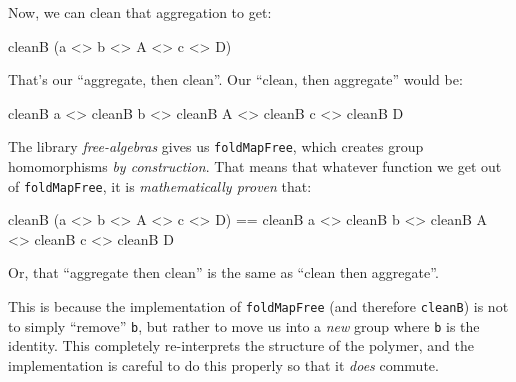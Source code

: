 \documentclass[]{article}
\newenvironment{Shaded}{}{}
\newcommand{\DataTypeTok}[1]{\textcolor[rgb]{0.56,0.13,0.00}{#1}}
\newcommand{\NormalTok}[1]{#1}
\newcommand{\OperatorTok}[1]{\textcolor[rgb]{0.40,0.40,0.40}{#1}}
\begin{document}
Now, we can clean that aggregation to get:

\begin{Shaded}
\begin{Highlighting}[]
\NormalTok{cleanB (a }\OperatorTok{\textless{}\textgreater{}}\NormalTok{ b }\OperatorTok{\textless{}\textgreater{}} \DataTypeTok{A} \OperatorTok{\textless{}\textgreater{}}\NormalTok{ c }\OperatorTok{\textless{}\textgreater{}} \DataTypeTok{D}\NormalTok{)}
\end{Highlighting}
\end{Shaded}

That's our ``aggregate, then clean''. Our ``clean, then aggregate'' would be:

\begin{Shaded}
\begin{Highlighting}[]
\NormalTok{cleanB a }\OperatorTok{\textless{}\textgreater{}}\NormalTok{ cleanB b }\OperatorTok{\textless{}\textgreater{}}\NormalTok{ cleanB }\DataTypeTok{A} \OperatorTok{\textless{}\textgreater{}}\NormalTok{ cleanB c }\OperatorTok{\textless{}\textgreater{}}\NormalTok{ cleanB }\DataTypeTok{D}
\end{Highlighting}
\end{Shaded}

The library \emph{free-algebras} gives us \texttt{foldMapFree}, which creates
group homomorphisms \emph{by construction}. That means that whatever function we
get out of \texttt{foldMapFree}, it is \emph{mathematically proven} that:

\begin{Shaded}
\begin{Highlighting}[]
\NormalTok{cleanB (a }\OperatorTok{\textless{}\textgreater{}}\NormalTok{ b }\OperatorTok{\textless{}\textgreater{}} \DataTypeTok{A} \OperatorTok{\textless{}\textgreater{}}\NormalTok{ c }\OperatorTok{\textless{}\textgreater{}} \DataTypeTok{D}\NormalTok{)}
 \OperatorTok{==}\NormalTok{ cleanB a }\OperatorTok{\textless{}\textgreater{}}\NormalTok{ cleanB b }\OperatorTok{\textless{}\textgreater{}}\NormalTok{ cleanB }\DataTypeTok{A} \OperatorTok{\textless{}\textgreater{}}\NormalTok{ cleanB c }\OperatorTok{\textless{}\textgreater{}}\NormalTok{ cleanB }\DataTypeTok{D}
\end{Highlighting}
\end{Shaded}

Or, that ``aggregate then clean'' is the same as ``clean then aggregate''.

This is because the implementation of \texttt{foldMapFree} (and therefore
\texttt{cleanB}) is not to simply ``remove'' \texttt{b}, but rather to move us
into a \emph{new} group where \texttt{b} is the identity. This completely
re-interprets the structure of the polymer, and the implementation is careful to
do this properly so that it \emph{does} commute.
\end{document}
